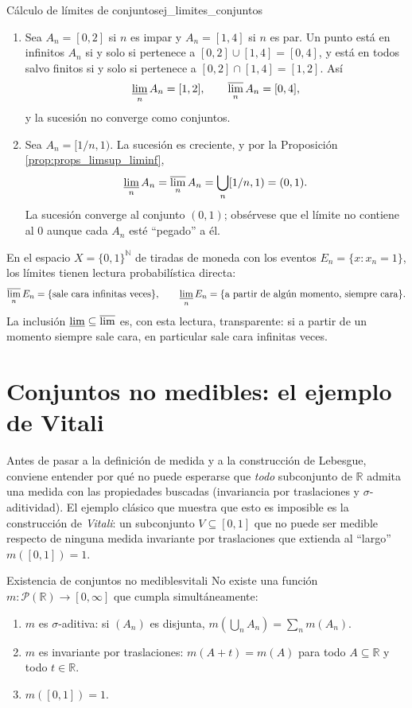 \documentclass[11pt, a4paper]{article}
\begin{document}
\begin{ejemplo}{Cálculo de límites de conjuntos}{ej_limites_conjuntos}
\begin{enumerate}
    \item Sea $A_n = [0, 2]$ si $n$ es impar y $A_n = [1, 4]$ si $n$ es par. Un punto está en
    infinitos $A_n$ si y solo si pertenece a $[0,2] \cup [1,4] = [0,4]$, y está en todos salvo
    finitos si y solo si pertenece a $[0,2] \cap [1,4] = [1,2]$. Así
    $$ \varliminf_n A_n = [1, 2], \qquad \varlimsup_n A_n = [0, 4], $$
    y la sucesión no converge como conjuntos.
    \item Sea $A_n = [1/n, 1)$. La sucesión es creciente, y por la Proposición
    \ref{prop:props_limsup_liminf},
    $$ \varliminf_n A_n = \varlimsup_n A_n = \bigcup_n [1/n, 1) = (0, 1). $$
    La sucesión converge al conjunto $(0,1)$; obsérvese que el límite no contiene al $0$
    aunque cada $A_n$ esté ``pegado'' a él.
\end{enumerate}
\end{ejemplo}

\obs En el espacio $X = \{0,1\}^{\mathbb{N}}$ de tiradas de moneda con los eventos
$E_n = \{x : x_n = 1\}$, los límites tienen lectura probabilística directa:
$$ \varlimsup_n E_n = \{\text{sale cara infinitas veces}\}, \qquad
\varliminf_n E_n = \{\text{a partir de algún momento, siempre cara}\}. $$
La inclusión $\varliminf \subseteq \varlimsup$ es, con esta lectura, transparente: si a partir
de un momento siempre sale cara, en particular sale cara infinitas veces.

\newpage

\section{Conjuntos no medibles: el ejemplo de Vitali}

Antes de pasar a la definición de medida y a la construcción de Lebesgue, conviene entender
por qué no puede esperarse que \emph{todo} subconjunto de $\mathbb{R}$ admita una medida con las
propiedades buscadas (invariancia por traslaciones y $\sigma$-aditividad). El ejemplo
clásico que muestra que esto es imposible es la construcción de \emph{Vitali}: un subconjunto
$V \subseteq [0, 1]$ que no puede ser medible respecto de ninguna medida invariante por
traslaciones que extienda al ``largo'' $m([0, 1]) = 1$.

\begin{teorema}{Existencia de conjuntos no medibles}{vitali}
No existe una función $m: \mathcal{P}(\mathbb{R}) \to [0, \infty]$ que cumpla simultáneamente:
\begin{enumerate}
    \item $m$ es $\sigma$-aditiva: si $(A_n)$ es disjunta, $m(\bigcup_n A_n) = \sum_n m(A_n)$.
    \item $m$ es invariante por traslaciones: $m(A + t) = m(A)$ para todo $A \subseteq \mathbb{R}$
    y todo $t \in \mathbb{R}$.
    \item $m([0, 1]) = 1$.
\end{enumerate}
\end{teorema}
\end{document}
